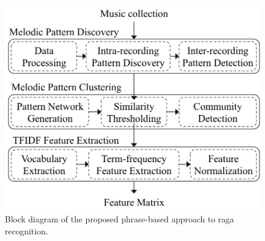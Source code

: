 
%
%

\begin{figure}
	\begin{center}
		\includegraphics[width=\figSizeSeventy]{ch07_ragaRecognition/figures/bd_phasebased_raga_recognition.pdf}
	\end{center}
	\caption{Block diagram of the proposed phrase-based approach to \gls{raga} recognition.}
	\label{fig:bd_phasebased_raga_recognition}
\end{figure}


